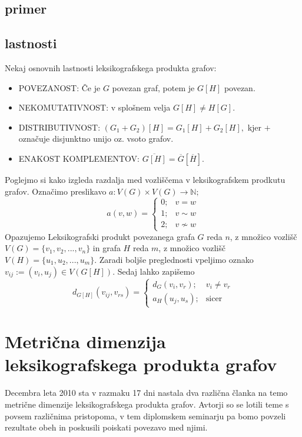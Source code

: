 \documentclass[mat1, tisk]{fmfdelo}
\begin{document}
\subsection{primer}


\subsection{lastnosti}
Nekaj osnovnih lastnosti leksikografskega produkta grafov:
\begin{itemize}
    \item POVEZANOST: Če je $G$ povezan graf, potem je $G[H]$ povezan. 
    \item NEKOMUTATIVNOST: v splošnem velja $G[H] \neq H[G].$
    \item DISTRIBUTIVNOST: $(G_1 + G_2)[H] = G_1[H] + G_2[H],$ kjer $+$ označuje disjunktno unijo oz. vsoto grafov.
    \item ENAKOST KOMPLEMENTOV: $\overline{G[H]} = \overline{G} [\overline{H}].$
\end{itemize}

Poglejmo si kako izgleda razdalja med vozliščema v leksikografskem prodkutu grafov. 
Označimo preslikavo  $a: V(G) \times V(G) \rightarrow \mathbb{N};$   
$$ a(v, w) = \begin{cases}
    0; & v = w \\
    1; & v \sim w \\
    2; & v \not\sim w
\end{cases} 
$$ 
Opazujemo Leksikografski produkt povezanega grafa $G$ reda $n$, z množico vozlišč
$V(G) = \{v_1, v_2, ... , v_n \}$ in grafa $H$ reda $m$, z množico vozlišč 
$V(H) = \{u_1, u_2, ... , u_m \}$. Zaradi boljše preglednosti vpeljimo oznako $v_{ij} := (v_i, u_j) \in V(G[H]).$
Sedaj lahko zapišemo
$$
d_{G[H]}(v_{ij}, v_{rs}) = \begin{cases}
        d_G(v_i, v_r); & v_i \neq v_r \\
        a_H(u_j, u_s); & \text{sicer}
    \end{cases}
$$ 

\section{Metrična dimenzija leksikografskega produkta grafov}
Decembra leta 2010 sta v razmaku 17 dni nastala dva različna članka na temo metrične dimenzije leksikografskega produkta grafov. 
Avtorji so se lotili teme s povsem različnima pristopoma, v tem diplomskem seminarju pa bomo povzeli rezultate obeh in poskusili poiskati povezavo med njimi.  
\end{document}
